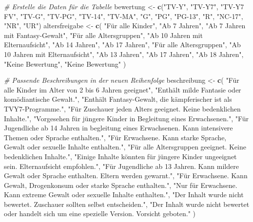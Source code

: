 \documentclass[
]{article}
\newenvironment{Shaded}{\begin{snugshade}}{\end{snugshade}}
\newcommand{\CommentTok}[1]{\textcolor[rgb]{0.56,0.35,0.01}{\textit{#1}}}
\newcommand{\FunctionTok}[1]{\textcolor[rgb]{0.13,0.29,0.53}{\textbf{#1}}}
\newcommand{\NormalTok}[1]{#1}
\newcommand{\OtherTok}[1]{\textcolor[rgb]{0.56,0.35,0.01}{#1}}
\newcommand{\StringTok}[1]{\textcolor[rgb]{0.31,0.60,0.02}{#1}}
\begin{document}
\begin{Shaded}
\begin{Highlighting}[]
\CommentTok{\# Erstelle die Daten für die Tabelle}
\NormalTok{bewertung }\OtherTok{\textless{}{-}} \FunctionTok{c}\NormalTok{(}\StringTok{"TV{-}Y"}\NormalTok{, }\StringTok{"TV{-}Y7"}\NormalTok{, }\StringTok{"TV{-}Y7 FV"}\NormalTok{, }\StringTok{"TV{-}G"}\NormalTok{, }\StringTok{"TV{-}PG"}\NormalTok{, }\StringTok{"TV{-}14"}\NormalTok{, }\StringTok{"TV{-}MA"}\NormalTok{, }\StringTok{"G"}\NormalTok{, }\StringTok{"PG"}\NormalTok{, }\StringTok{"PG{-}13"}\NormalTok{, }\StringTok{"R"}\NormalTok{, }\StringTok{"NC{-}17"}\NormalTok{, }\StringTok{"NR"}\NormalTok{, }\StringTok{"UR"}\NormalTok{)}
\NormalTok{altersfreigabe }\OtherTok{\textless{}{-}} \FunctionTok{c}\NormalTok{(}
  \StringTok{"Für alle Kinder"}\NormalTok{, }\StringTok{"Ab 7 Jahren"}\NormalTok{, }\StringTok{"Ab 7 Jahren mit Fantasy{-}Gewalt"}\NormalTok{, }\StringTok{"Für alle Altersgruppen"}\NormalTok{, }
  \StringTok{"Ab 10 Jahren mit Elternaufsicht"}\NormalTok{, }\StringTok{"Ab 14 Jahren"}\NormalTok{, }\StringTok{"Ab 17 Jahren"}\NormalTok{, }\StringTok{"Für alle Altersgruppen"}\NormalTok{, }
  \StringTok{"Ab 10 Jahren mit Elternaufsicht"}\NormalTok{, }\StringTok{"Ab 13 Jahren"}\NormalTok{, }\StringTok{"Ab 17 Jahren"}\NormalTok{, }\StringTok{"Ab 18 Jahren"}\NormalTok{, }\StringTok{"Keine Bewertung"}\NormalTok{, }\StringTok{"Keine Bewertung"}
\NormalTok{)}

\CommentTok{\# Passende Beschreibungen in der neuen Reihenfolge}
\NormalTok{beschreibung }\OtherTok{\textless{}{-}} \FunctionTok{c}\NormalTok{(}
  \StringTok{"Für alle Kinder im Alter von 2 bis 6 Jahren geeignet"}\NormalTok{,}
  \StringTok{"Enthält milde Fantasie oder komödiantische Gewalt."}\NormalTok{,}
  \StringTok{"Enthält Fantasy{-}Gewalt, die kämpferischer ist als TVY7{-}Programme."}\NormalTok{,}
  \StringTok{"Für Zuschauer jeden Alters geeignet. Keine bedenklichen Inhalte."}\NormalTok{,}
  \StringTok{"Vorgesehen für jüngere Kinder in Begleitung eines Erwachsenen."}\NormalTok{,}
  \StringTok{"Für Jugendliche ab 14 Jahren in begleitung eines Erwachsenen. Kann intensivere Themen oder Sprache enthalten."}\NormalTok{,}
  \StringTok{"Für Erwachsene. Kann starke Sprache, Gewalt oder sexuelle Inhalte enthalten."}\NormalTok{,}
  \StringTok{"Für alle Altersgruppen geeignet. Keine bedenklichen Inhalte."}\NormalTok{,}
  \StringTok{"Einige Inhalte könnten für jüngere Kinder ungeeignet sein. Elternaufsicht empfohlen."}\NormalTok{,}
  \StringTok{"Für Jugendliche ab 13 Jahren. Kann mildere Gewalt oder Sprache enthalten. Eltern werden gewarnt."}\NormalTok{,}
  \StringTok{"Für Erwachsene. Kann Gewalt, Drogenkonsum oder starke Sprache enthalten."}\NormalTok{,}
  \StringTok{"Nur für Erwachsene. Kann extreme Gewalt oder sexuelle Inhalte enthalten."}\NormalTok{,}
  \StringTok{"Der Inhalt wurde nicht bewertet. Zuschauer sollten selbst entscheiden."}\NormalTok{,}
  \StringTok{"Der Inhalt wurde nicht bewertet oder handelt sich um eine spezielle Version. Vorsicht geboten."}
\NormalTok{)}



\end{Highlighting}
\end{Shaded}
\end{document}
